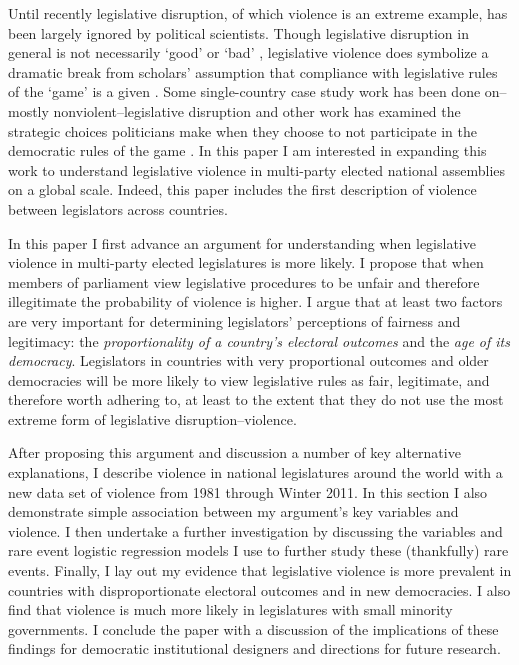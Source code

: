 \documentclass[a4paper]{article}\usepackage{graphicx, color}
\begin{document}
Until recently legislative disruption, of which violence is an extreme example, has been largely ignored by political scientists. Though legislative disruption in general is not necessarily `good' or `bad' \citep[see][for discussions of how disruption may be a `safety valve' in contexts where dissent is strongly curtailed]{Ostrow1996,Young2002}, legislative violence does symbolize a dramatic break from scholars' assumption that compliance with legislative rules of the `game' is a given \citep{Wolfe2004}. Some single-country case study work has been done on--mostly nonviolent--legislative disruption \cite[see][]{Armitage2013,Johnson2013,Ilie2013,Wolfe2004} and other work has examined the strategic choices politicians make when they choose to not participate in the democratic rules of the game \citep[e.g.][]{wilkinson2006,Beaulieu2008}. In this paper I am interested in expanding this work to understand legislative violence in multi-party elected national assemblies on a global scale. Indeed, this paper includes the first description of violence between legislators across countries. 

In this paper I first advance an argument for understanding when legislative violence in multi-party elected legislatures is more likely. I propose that when members of parliament view legislative procedures to be unfair and therefore illegitimate the probability of violence is higher. I argue that at least two factors are very important for determining legislators' perceptions of fairness and legitimacy: the \emph{proportionality of a country's electoral outcomes} and the \emph{age of its democracy}. Legislators in countries with very proportional outcomes and older democracies will be more likely to view legislative rules as fair, legitimate, and therefore worth adhering to, at least to the extent that they do not use the most extreme form of legislative disruption--violence. 

After proposing this argument and discussion a number of key alternative explanations, I describe violence in national legislatures around the world with a new data set of violence from 1981 through Winter 2011. In this section I also demonstrate simple association between my argument's key variables and violence. I then undertake a further investigation by discussing the variables and rare event logistic regression models \citep{KingRareEvents2001, KingRareEventsPA2001} I use to further study these (thankfully) rare events. Finally, I lay out my evidence that legislative violence is more prevalent in countries with disproportionate electoral outcomes and in new democracies. I also find that violence is much more likely in legislatures with small minority governments. I conclude the paper with a discussion of the implications of these findings for democratic institutional designers and directions for future research.
\end{document}
